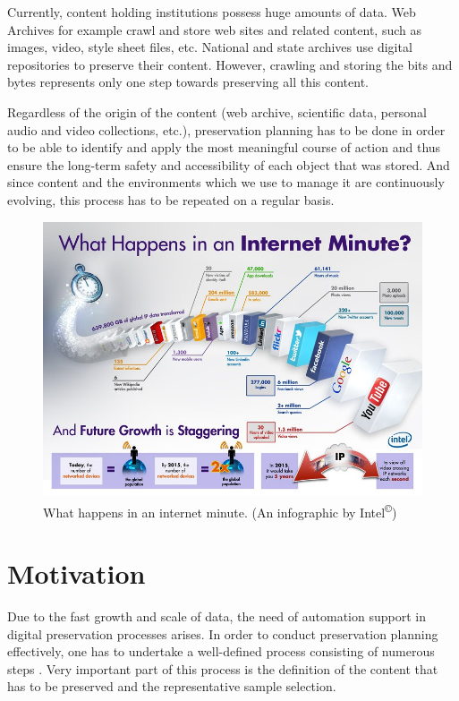 Currently, content holding institutions possess huge amounts of data. Web Archives for example crawl and store web sites and related content, such as images, video, style sheet files, etc. National and state archives use digital repositories to preserve their content. However, crawling and storing the bits and bytes represents only one step towards preserving all this content.

Regardless of the origin of the content (web archive, scientific data, personal audio and video collections, etc.), preservation planning has to be done in order to be able to identify and apply the most meaningful course of action and thus ensure the long-term safety and accessibility of each object that was stored. And since content and the environments which we use to manage it are continuously evolving, this process has to be repeated on a regular basis.

\begin{figure}[hb]
\begin{center}
\includegraphics[width=6in]{figures/introduction/intel_oneminute_internet.jpg}
\caption{What happens in an internet minute. (An infographic by Intel\textsuperscript{\copyright})}
\label{fig:intel_oneminute_internet}
\end{center}
\end{figure}

\section{Motivation}
Due to the fast growth and scale of data, the need of automation support in digital preservation processes arises. In order to conduct preservation planning effectively, one has to undertake a well-defined process consisting of numerous steps \cite{Becker:2009fk}. Very important part of this process is the definition of the content that has to be preserved and the representative sample selection. 

